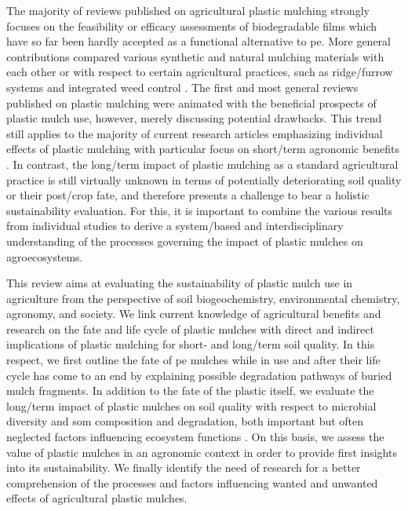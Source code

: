 The majority of reviews published on agricultural plastic mulching strongly focuses on the feasibility or efficacy assessments of biodegradable films \citep{BrodhagenBiodegradable2015,KasirajanPolyethylene2012} which have so far been hardly accepted as a functional alternative to \ac{pe}. More general contributions compared various synthetic and natural mulching materials with each other \citep{Chalker-ScottImpact2007,GreerAluminum2003} or with respect to certain agricultural practices, such as ridge\-/furrow systems \citep{GanRidgeFurrow2013} and integrated weed control \citep{BondNonchemical2001,CaseReview2005}. The first and most general reviews published on plastic mulching \citep{LamontPlastic1993,TararaMicroclimate2000} were animated with the beneficial prospects of plastic mulch use, however, merely discussing potential drawbacks. This trend still applies to the majority of current research articles emphasizing individual effects of plastic mulching with particular focus on short\-/term agronomic benefits \citep[for instance,][]{HeRice2013,Lopez-LopezWater2015,WangCombination2010}. In contrast, the long\-/term impact of plastic mulching as a standard agricultural practice is still virtually unknown in terms of potentially deteriorating soil quality or their post\-/crop fate, and therefore presents a challenge to bear a holistic sustainability evaluation. For this, it is important to combine the various results from individual studies to derive a system\-/based and interdisciplinary understanding of the processes governing the impact of plastic mulches on agroecosystems.

This review aims at evaluating the sustainability of plastic mulch use in agriculture from the perspective of soil biogeochemistry, environmental chemistry, agronomy, and society. We link current knowledge of agricultural benefits and research on the fate and life cycle of plastic mulches with direct and indirect implications of plastic mulching for short- and long\-/term soil quality. In this respect, we first outline the fate of \ac{pe} mulches while in use and after their life cycle has come to an end by explaining possible degradation pathways of buried mulch fragments. In addition to the fate of the plastic itself, we evaluate the long\-/term impact of plastic mulches on soil quality with respect to microbial diversity and \ac{som} composition and degradation, both important but often neglected factors influencing ecosystem functions \citep{PowerEcosystem2010}. On this basis, we assess the value of plastic mulches in an agronomic context in order to provide first insights into its sustainability. We finally identify the need of research for a better comprehension of the processes and factors influencing wanted and unwanted effects of agricultural plastic mulches.

